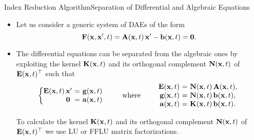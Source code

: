 \begin{frame}{Index Reduction Algorithm}{Separation of Differential and Algebraic Equations}
  \begin{itemize}
    \item Let us consider a generic system of \acp{DAE} of the form
    \begin{equation*}
      \mathbf{F}(\mathbf{x}, \mathbf{x}^\prime, t) = \mathbf{A}(\mathbf{x}, t) \, \mathbf{x}^\prime - \mathbf{b}(\mathbf{x}, t) = \mathbf{0} \text{.}
    \end{equation*}
    \item The differential equations can be separated from the algebraic ones by exploiting the kernel $\mathbf{K}(\mathbf{x}, t)$ and its orthogonal complement $\mathbf{N}(\mathbf{x}, t)$ of $\mathbf{E}(\mathbf{x}, t)^\top$ such that
    \begin{equation*}
      \left\{\!\!\!\begin{array}{r@{~}c@{~}l}
        \mE \, \mxp &=& \mg \\
        \m{0}\phantom{\prime} &=& \ma
      \end{array}\right.
      \qquad \text{where} \qquad
      \begin{array}{r@{~}c@{~}l}
        \mE &=& \mN \, \mA \text{,} \\
        \mg &=& \mN \, \mb \text{,} \\
        \ma &=& \mK \, \mb \text{.}
      \end{array}
    \end{equation*}

    \begin{bbox}
      To calculate the kernel $\mathbf{K}(\mathbf{x}, t)$ and its orthogonal complement $\mathbf{N}(\mathbf{x}, t)$ of $\mathbf{E}(\mathbf{x}, t)^\top$ we use \ac{LU} or \ac{FFLU} matrix factorizations.
    \end{bbox}
  \end{itemize}
\end{frame}

